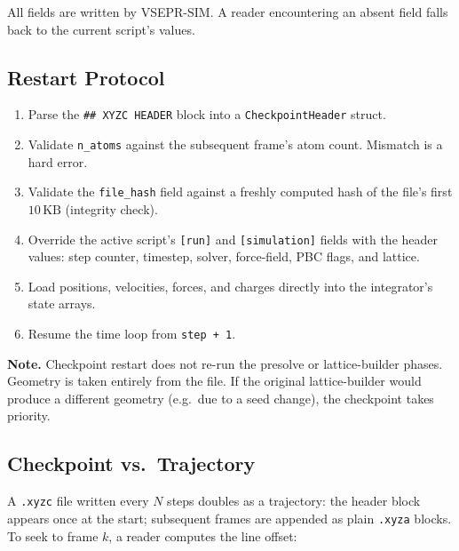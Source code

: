 \documentclass[11pt, a4paper, oneside]{article}
\begin{document}
All fields are written by VSEPR-SIM. A reader encountering an absent
field falls back to the current script's values.

\subsection{Restart Protocol}
\label{sec:xyzc_restart}

\begin{enumerate}
  \item Parse the \texttt{\#\# XYZC HEADER} block into a
    \texttt{CheckpointHeader} struct.
  \item Validate \texttt{n\_atoms} against the subsequent frame's atom
    count. Mismatch is a hard error.
  \item Validate the \texttt{file\_hash} field against a freshly computed
    hash of the file's first $10\,\mathrm{KB}$ (integrity check).
  \item Override the active script's \texttt{[run]} and \texttt{[simulation]}
    fields with the header values: step counter, timestep, solver,
    force-field, PBC flags, and lattice.
  \item Load positions, velocities, forces, and charges directly into the
    integrator's state arrays.
  \item Resume the time loop from \texttt{step + 1}.
\end{enumerate}

\noindent\textbf{Note.} Checkpoint restart does not re-run the presolve or
lattice-builder phases. Geometry is taken entirely from the file. If the
original lattice-builder would produce a different geometry (e.g.\ due to
a seed change), the checkpoint takes priority.

\subsection{Checkpoint vs.\ Trajectory}
\label{sec:xyzc_vs_traj}

A \texttt{.xyzc} file written every $N$ steps doubles as a trajectory: the
header block appears once at the start; subsequent frames are appended as
plain \texttt{.xyza} blocks. To seek to frame $k$, a reader computes the
line offset:
\end{document}
